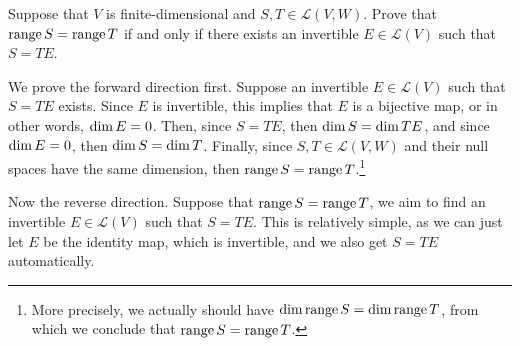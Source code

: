 \documentclass[10pt]{article}
\begin{document}
	\begin{problem}
		Suppose that \( V \) is finite-dimensional and \( S, T\in \mathcal L(V, W) \). Prove that 
		\( \operatorname*{range} S = \operatorname*{range} T \) if and only if there exists an invertible \( E \in \mathcal L(V) \) such that 
		 \( S = TE \). 
	\end{problem}

	\begin{solution}
		We prove the forward direction first. Suppose an invertible \( E \in \mathcal L(V) \) 
		such that \( S = TE \) exists. Since \( E \) is invertible, this implies that \( E \) is 
		a bijective map, or in other words, \( \dim \null E = 0 \). Then, since \( S = TE \), then 
		\( \dim \null S = \dim \null TE \), and since \( \dim \null E = 0 \), then \( \dim \null S = 
		\dim \null T\). Finally, since \( S, T \in \mathcal L(V, W) \) and their null spaces have the same dimension, 
		then \( \operatorname*{range} S = \operatorname*{range} T \).\footnote{More precisely, we actually should have \( \dim \operatorname*{range} S 
		= \dim \operatorname*{range} T\), from which we conclude that \( \operatorname*{range} S = \operatorname*{range} T \).}

		Now the reverse direction. Suppose that \( \operatorname*{range} S = \operatorname*{range} T \), we aim to find an 
		invertible \( E \in \mathcal L(V) \) such that \( S = TE \). This is relatively simple, as we can just 
		let \( E \) be the identity map, which is invertible, and we also get \( S = TE \) automatically.
	\end{solution}
\end{document}
